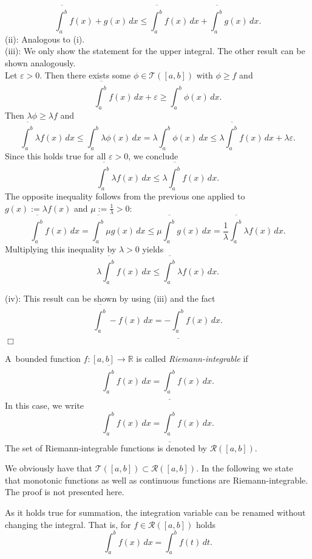 \[\overline{\int_a^b}f(x)+g(x)\, dx\leq\overline{\int_a^b}f(x)\, dx+\overline{\int_a^b}g(x)\, dx.\]
(ii): Analogous to (i).\\
(iii):  We only show the statement for the upper integral. The other result can be shown analogously.\\
Let $\varepsilon>0$. Then there exists some $\phi\in\mathcal{T}([a,b])$ with $\phi\geq f$ and
\[\overline{\int_a^b}f(x)\, dx+\varepsilon\geq{\int_a^b}\phi(x)\, dx.\]
Then $\lambda \phi\geq\lambda f$ and
\[\overline{\int_a^b} \lambda f(x)\, dx\leq{\int_a^b}\lambda\phi(x)\, dx=\lambda{\int_a^b}\phi(x)\, dx\leq \lambda\overline{\int_a^b} f(x)\, dx+\lambda\varepsilon.\]
Since this holds true for all $\varepsilon>0$, we conclude
\[\overline{\int_a^b}\lambda f(x)\, dx\leq\lambda \overline{\int_a^b}f(x)\, dx.\]
The opposite inequality follows from the previous one applied to $g(x):=\lambda f(x)$ and $\mu:=\frac{1}{\lambda}>0$:
\[\overline{\int_a^b} f(x)\, dx =  \overline{\int_a^b} \mu g(x)\, dx \leq \mu \overline{\int_a^b}g(x)\, dx = \frac{1}{\lambda} \overline{\int_a^b}\lambda f(x)\, dx.\]
Multiplying this inequality by $\lambda>0$ yields
\[\lambda \overline{\int_a^b} f(x)\, dx  \leq \overline{\int_a^b}\lambda f(x)\, dx.\]

(iv): This result can be shown by using (iii) and the fact
\[\overline{\int_a^b}-f(x)\, dx=-\underline{\int_a^b}f(x)\, dx.\]
\hfill$\Box$

\begin{Definition}{}
A~bounded function $f:[a,b]\to\mathbb{R}$ is called \emph{Riemann-integrable} if
\[\overline{\int_a^b}f(x)\, dx=\underline{\int_a^b}f(x)\, dx.\]
In this case, we write
\[{\int_a^b}f(x)\, dx=\underline{\int_a^b}f(x)\, dx.\]
The set of Riemann-integrable functions is denoted by $\mathcal{R}([a,b])$.
\end{Definition}


We obviously have that $\mathcal{T}([a,b])\subset\mathcal{R}([a,b])$. In the following we state that monotonic functions as well as continuous functions are Riemann-integrable. The proof is not presented here.

\begin{Remark}{}
As it holds true for summation, the integration variable can be renamed without changing the integral. That is, for $f\in\mathcal{R}([a,b])$ holds
\[{\int_a^b}f(x)\, dx={\int_a^b}f(t)\, dt.\]
\end{Remark}


